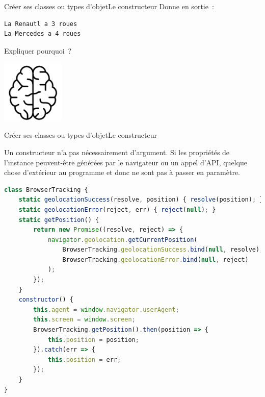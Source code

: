 \documentclass{beamer}
\begin{document}
    \begin{frame}[fragile]{Créer ses classes ou types d'objet}{Le constructeur}
        Donne en sortie~:
        \begin{lstlisting}[language=Bash,title={\scriptsize{Commande dans un Shell/Console/PowerShell}}]
La Renautl a 3 roues
La Mercedes a 4 roues
        \end{lstlisting}
        Expliquer pourquoi~?
        \bigbreak
        \begin{center}
            \includegraphics[width=3cm]{image/intelligence}
        \end{center}
    \end{frame}


    \begin{frame}[fragile]{Créer ses classes ou types d'objet}{Le constructeur}
        \begin{footnotesize}
            Un constructeur n'a pas nécessairement d'argument.
            Si les propriétés de l'instance peuvent-être générées par le navigateur ou un appel d'API, quelque chose d'extérieur au programme et donc ne sont pas à passer en paramètre.
        \end{footnotesize}
        \begin{lstlisting}[language=JavaScript,title={\scriptsize{Script JavaScript}},basicstyle=\tiny\ttfamily]
class BrowserTracking {
    static geolocationSuccess(resolve, position) { resolve(position); }
    static geolocationError(reject, err) { reject(null); }
    static getPosition() {
        return new Promise((resolve, reject) => {
            navigator.geolocation.getCurrentPosition(
                BrowserTracking.geolocationSuccess.bind(null, resolve),
                BrowserTracking.geolocationError.bind(null, reject)
            );
        });
    }
    constructor() {
        this.agent = window.navigator.userAgent;
        this.screen = window.screen;
        BrowserTracking.getPosition().then(position => {
            this.position = position;
        }).catch(err => {
            this.position = err;
        });
    }
}
        \end{lstlisting}
    \end{frame}
\end{document}

